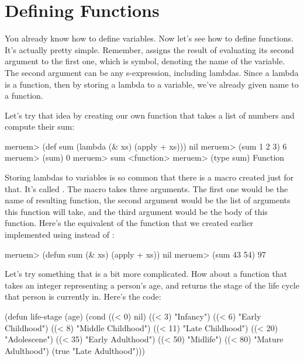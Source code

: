 \begin{REPL}
meruem> (def foo 10)
nil
meruem> (def foo 20)
An error has occurred. foo is already defined.
Source: .home.melvic.meruem.meruem.prelude [1:6}]
(def foo 20)
     ^
\end{REPL}

\section{Defining Functions}
You already know how to define variables. Now let's see how to define functions. It's actually pretty simple. Remember,  assigns the result of evaluating its second argument to the first one, which is symbol, denoting the name of the variable. The second argument can be any s-expression, including lambdas. Since a lambda is a function, then by storing a lambda to a variable, we've already given name to a function. 

Let's try that idea by creating our own function  that takes a list of numbers and compute their sum:

\begin{REPL}
meruem> (def sum (lambda (& xs) (apply + xs)))
nil
meruem> (sum 1 2 3)
6
meruem> (sum)
0
meruem> sum 
<function>
meruem> (type sum)
Function
\end{REPL}

Storing lambdas to variables is so common that there is a macro created just for that. It's called . The  macro takes three arguments. The first one would be the name of resulting function, the second argument would be the list of arguments this function will take, and the third argument would be the body of this function. Here's the equivalent of the  function that we created earlier implemented using  instead of :

\begin{REPL}
meruem> (defun sum (& xs) (apply + xs))
nil
meruem> (sum 43 54)
97
\end{REPL}

Let's try something that is a bit more complicated. How about a function that takes an integer representing a person's age, and returns the stage of the life cycle that person is currently in. Here's the code:

\begin{Meruem}
(defun life-stage (age)
   (cond 
     ((< 0) nil)
     ((< 3) "Infancy")
     ((< 6) "Early Childhood")
     ((< 8) "Middle Childhood")
     ((< 11) "Late Childhood")
     ((< 20) "Adolescene")
     ((< 35) "Early Adulthood")
     ((< 50) "Midlife")
     ((< 80) "Mature Adulthood")
     (true "Late Adulthood")))
\end{Meruem}

